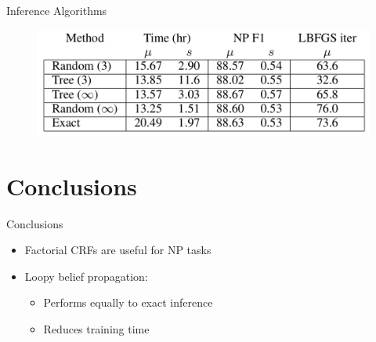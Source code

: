 \documentclass[presentation,bigger]{beamer}
\begin{document}
\begin{frame}[label={sec:orgheadline25}]{Inference Algorithms}
\begin{figure}[htb]
\centering
\includegraphics[width=\textwidth]{figures/npinf.pdf}
\end{figure}
\end{frame}
\section{Conclusions}
\label{sec:orgheadline28}
\begin{frame}[label={sec:orgheadline27}]{Conclusions}
\begin{itemize}
\item Factorial CRFs are useful for NP tasks
\item Loopy belief propagation:
\begin{itemize}
\item Performs equally to exact inference
\item Reduces training time
\end{itemize}
\end{itemize}
\end{frame}
\end{document}

